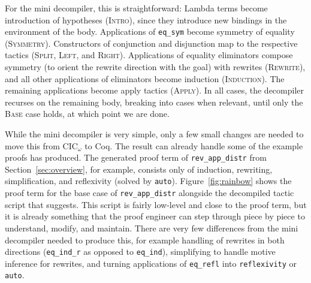 For the mini decompiler, this is straightforward: Lambda terms become introduction of hypotheses (\textsc{Intro}), since they introduce new bindings
in the environment of the body. Applications of \lstinline{eq_sym} become symmetry of equality (\textsc{Symmetry}).
Constructors of conjunction and disjunction map to the respective tactics (\textsc{Split}, \textsc{Left}, and \textsc{Right}).
Applications of equality eliminators compose symmetry (to orient the rewrite direction with the goal) with rewrites (\textsc{Rewrite}),
and all other applications of eliminators become induction (\textsc{Induction}).
The remaining applications become apply tactics (\textsc{Apply}).
In all cases, the decompiler recurses on the remaining body, breaking into cases when relevant, until only the \textsc{Base}
case holds, at which point we are done.

While the mini decompiler is very simple, only a few small changes are needed
to move this from CIC$_{\omega}$ to Coq.
The result can already handle some of the example proofs \toolname has produced.
The generated proof term of \lstinline{rev_app_distr} from Section~\ref{sec:overview},
for example, consists only of induction, rewriting, simplification, and reflexivity (solved by \lstinline{auto}).
Figure~\ref{fig:rainbow} shows the proof term for the base case of \lstinline{rev_app_distr} 
alongside the decompiled tactic script that \toolname suggests.
This script is fairly low-level and close to the proof term, but it is already something that the proof engineer
can step through piece by piece to understand, modify, and maintain.
There are very few differences from the mini decompiler needed to produce this,
for example handling of rewrites in both directions (\lstinline{eq_ind_r} as opposed to \lstinline{eq_ind}),
simplifying to handle motive inference for rewrites,
and turning applications of \lstinline{eq_refl} into \lstinline{reflexivity} or \lstinline{auto}.



